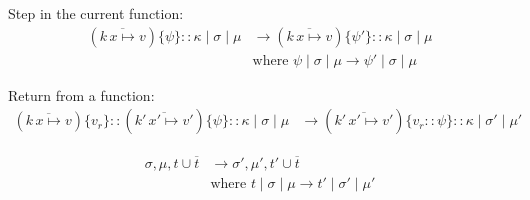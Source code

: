 \documentclass{article}
\begin{document}
Step in the current function:
\begin{align*}
  (\overline{k\,x \mapsto v})\{\psi\} :: \kappa \mid \sigma \mid \mu
   &\longrightarrow
  (\overline{k\,x \mapsto v})\{\psi'\} :: \kappa \mid \sigma \mid \mu \\
  & \text{where } 
  \psi \mid \sigma \mid \mu \longrightarrow \psi' \mid \sigma \mid \mu 
\end{align*}

Return from a function:
\begin{align*}
  (\overline{k\,x \mapsto v})\{v_r\} ::
  (\overline{k'\,x'\mapsto v'})\{\psi\} :: \kappa \mid \sigma \mid \mu
   &\longrightarrow
  (\overline{k'\,x'\mapsto v'})\{v_r :: \psi\} :: \kappa \mid \sigma' \mid \mu'
\end{align*}

\begin{align*}
  \sigma,\mu, t \cup \overline{t}
   & \longrightarrow
  \sigma',\mu', t' \cup \overline{t} \\
  & \text{where } t \mid \sigma \mid \mu \longrightarrow t' \mid \sigma' \mid \mu'
\end{align*}
\end{document}
